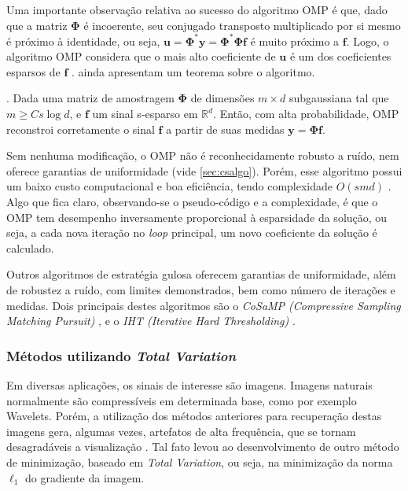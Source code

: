 \documentclass[cic,tc]{iiufrgs}
\renewcommand{\vec}[1]{\bm{#1}}
\begin{document}
Uma importante observação relativa ao sucesso do algoritmo OMP é que, dado que a matriz $\mathbf{\Phi}$ é incoerente,
seu conjugado transposto multiplicado por si mesmo é próximo à identidade, ou seja, 
$\vec{u} = \mathbf{\Phi}^* \vec{y} = \mathbf{\Phi}^* \mathbf{\Phi} \vec{f}$ 
é muito próximo a $\vec{f}$. 
Logo, o algoritmo OMP considera que o mais alto coeficiente de 
$\vec{u}$ é um dos coeficientes esparsos de $\vec{f}$ \cite{chen2015compressed}.
\citet{GilbertOMP} ainda apresentam um teorema sobre o algoritmo.
\begin{teorema}
    \cite{GilbertOMP}.
    Dada uma matriz de amostragem $\mathbf{\Phi}$ de dimensões $m \times d$ subgaussiana tal que $m \ge C s \log{d}$, e
    $\vec{f}$ um sinal s-esparso em $\mathbb{R}^d$.
    Então, com alta probabilidade, OMP reconstroi corretamente o sinal $\vec{f}$ a partir de suas
    medidas $\vec{y} = \mathbf{\Phi}\vec{f}$.
\end{teorema}
Sem nenhuma modificação, o OMP não é reconhecidamente robusto a ruído, nem oferece garantias de uniformidade (vide \autoref{sec:csalgo}).
Porém, esse algoritmo possui um baixo custo computacional e boa eficiência, tendo complexidade 
$O(s m d)$ \cite{chen2015compressed}. 
Algo que fica claro, observando-se o pseudo-código e a complexidade, é que o OMP tem desempenho inversamente
proporcional à esparsidade da solução, ou seja, a cada nova iteração no \textit{loop} principal, um 
novo coeficiente da solução é calculado.

Outros algoritmos de estratégia gulosa oferecem garantias de uniformidade, além de robustez a ruído, com 
limites demonstrados, bem como número de iterações e medidas. Dois principais destes algoritmos são o 
\textit{CoSaMP (Compressive Sampling Matching Pursuit)} \cite{NeedellCoSaMP}, e o 
\textit{IHT (Iterative Hard Thresholding)} \cite{BLUMENSATHIHT}.

\subsubsection{Métodos utilizando \textit{Total Variation}}
Em diversas aplicações, os sinais de interesse são imagens. Imagens naturais normalmente são compressíveis
em determinada base, como por exemplo Wavelets. 
Porém, a utilização dos métodos anteriores para recuperação 
destas imagens gera, algumas vezes, artefatos de alta frequência, que se tornam desagradáveis a
visualização \cite{chen2015compressed}.
Tal fato levou ao desenvolvimento de outro método de minimização, baseado em \textit{Total Variation},
ou seja, na minimização da norma $\ell_1$ do gradiente da imagem.
\end{document}
